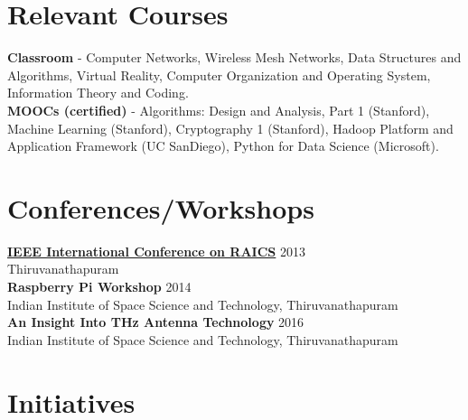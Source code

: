 \documentclass{resume}
\begin{document}
\begin{multicols}{2}
\section{Relevant Courses}

\textbf{Classroom} - Computer Networks, Wireless Mesh Networks, Data Structures and Algorithms, Virtual Reality, Computer Organization and Operating System, Information Theory and Coding.\\[.05in]
\textbf{MOOCs (certified)} - Algorithms: Design and Analysis, Part 1 (Stanford), Machine Learning (Stanford), Cryptography 1 (Stanford), Hadoop Platform and Application Framework (UC SanDiego), Python for Data Science (Microsoft).


\section{Conferences/Workshops}

\href{http://raics.in/}{\textbf{IEEE International Conference on RAICS}} \hfill 2013\\
Thiruvanathapuram\\
\textbf{Raspberry Pi Workshop} \hfill 2014\\
Indian Institute of Space Science and Technology, Thiruvanathapuram\\
\textbf{An Insight Into THz Antenna Technology} \hfill 2016\\
Indian Institute of Space Science and Technology, Thiruvanathapuram\\


\section{Initiatives}


\end{multicols}
\end{document}
